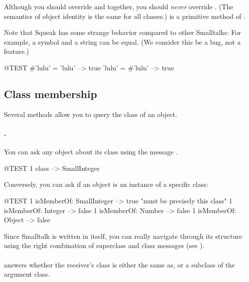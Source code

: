 \documentclass[a4paper,10pt,twoside]{book}
\begin{document}
Although you should override \ct{=} and  together, you should \emph{never} override \ct{==}.
(The semantics of object identity is the same for all classes.)
\ct{==} is a primitive method of .

Note that Squeak has some strange behavior compared to other Smalltalks:
For example, a symbol and a string can be equal.
(We consider this be a bug, not a feature.)

\begin{code}{@TEST}
#'lulu' = 'lulu' --> true
'lulu' = #'lulu' --> true
\end{code}


\subsection{Class membership}
Several methods allow you to query the class of an object. 

\paragraph{.}
You can ask any object about its class using the message .
\begin{code}{@TEST}
1 class --> SmallInteger
\end{code}

Conversely, you can ask if an object is an instance of a specific class:
\begin{code}{@TEST}
1 isMemberOf: SmallInteger --> true    "must be precisely this class"
1 isMemberOf: Integer          --> false
1 isMemberOf: Number        --> false
1 isMemberOf: Object           --> false
\end{code}

Since Smalltalk is written in itself, you can really navigate through its structure using the right combination of superclass and class messages (see ). 

\paragraph{}
 answers whether the receiver's class is either the same as, or a subclass of the argument class.
\end{document}
